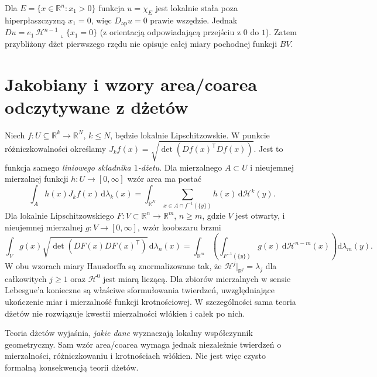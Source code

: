 \begin{przyklad}
Dla $E=\{x\in\mathbb R^n:x_1>0\}$ funkcja
$u=\chi_E$ jest lokalnie stała poza hiperpłaszczyzną
$x_1=0$, więc $D_{\mathrm{ap}}u=0$ prawie wszędzie.
Jednak $Du=e_1\,\mathcal H^{n-1}\llcorner\{x_1=0\}$
(z orientacją odpowiadającą przejściu z $0$ do $1$).
Zatem przybliżony dżet pierwszego rzędu nie opisuje
całej miary pochodnej funkcji $BV$.
\end{przyklad}

\section{Jakobiany i wzory area/coarea odczytywane z dżetów}
Niech $f:U\subseteq\mathbb R^k\to\mathbb R^N$,
$k\le N$, będzie lokalnie Lipschitzowskie.
W punkcie różniczkowalności określamy
$J_kf(x)=\sqrt{\det(Df(x)^{\mathsf T}Df(x))}$.
Jest to funkcja samego \emph{liniowego składnika $1$-dżetu}.
Dla mierzalnego $A\subset U$ i nieujemnej
mierzalnej funkcji $h:U\to[0,\infty]$ wzór area ma postać
\[
 \int_A h(x)J_kf(x)\,\mathrm d\lambda_k(x)
 =\int_{\mathbb R^N}\sum_{x\in A\cap f^{-1}(\{y\})}
 h(x)\,\mathrm d\mathcal H^k(y).
\]
Dla lokalnie Lipschitzowskiego $F:V\subset\mathbb R^n\to
\mathbb R^m$, $n\ge m$, gdzie $V$ jest otwarty,
i nieujemnej mierzalnej $g:V\to[0,\infty]$, wzór
koobszaru brzmi
\[
 \int_V g(x)\sqrt{\det(DF(x)DF(x)^{\mathsf T})}
 \,\mathrm d\lambda_n(x)
 =\int_{\mathbb R^m}\left(
 \int_{F^{-1}(\{y\})}g(x)\,\mathrm d\mathcal H^{n-m}(x)
 \right)\mathrm d\lambda_m(y).
\]
W obu wzorach miary Hausdorffa są znormalizowane tak,
że $\mathcal H^j|_{\mathbb R^j}=\lambda_j$ dla całkowitych
$j\ge1$ oraz $\mathcal H^0$ jest miarą liczącą.
Dla zbiorów mierzalnych w sensie Lebesgue'a konieczne
są właściwe sformułowania twierdzeń, uwzględniające
ukończenie miar i mierzalność funkcji krotnościowej.
W szczególności sama teoria dżetów nie rozwiązuje
kwestii mierzalności włókien i całek po nich.

\begin{uwaga}
Teoria dżetów wyjaśnia, \emph{jakie dane} wyznaczają
lokalny współczynnik geometryczny. Sam wzór area/coarea
wymaga jednak niezależnie twierdzeń o mierzalności,
różniczkowaniu i krotnościach włókien. Nie jest więc
czysto formalną konsekwencją teorii dżetów.
\end{uwaga}

